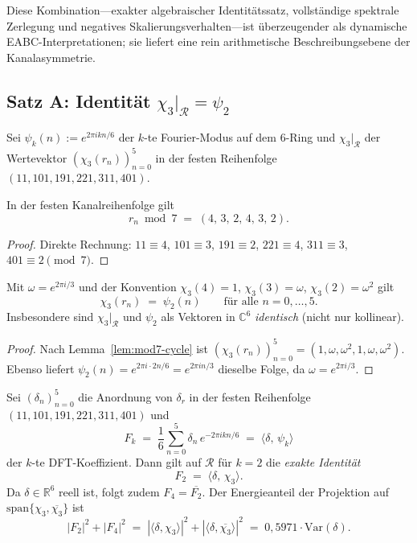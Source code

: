 Diese Kombination---exakter algebraischer Identitätssatz, vollständige
spektrale Zerlegung und negatives Skalierungsverhalten---ist
überzeugender als dynamische EABC-Interpretationen; sie liefert eine
rein arithmetische Beschreibungsebene der Kanalasymmetrie.

\subsection{Satz A: Identität $\chi_3|_{\mathcal{R}}=\psi_2$}

Sei $\psi_k(n) := e^{2\pi i kn/6}$ der $k$-te Fourier-Modus auf dem
$6$-Ring und $\chi_3|_{\mathcal{R}}$ der Wertevektor
$(\chi_3(r_n))_{n=0}^{5}$ in der festen Reihenfolge
$(11,101,191,221,311,401)$.

\begin{lemma}
\label{lem:mod7-cycle}
In der festen Kanalreihenfolge gilt
\[
  r_n \bmod 7 \;=\; (4,\,3,\,2,\,4,\,3,\,2).
\]
\end{lemma}

\begin{proof}
Direkte Rechnung:
$11\equiv 4$, $101\equiv 3$, $191\equiv 2$,
$221\equiv 4$, $311\equiv 3$, $401\equiv 2 \pmod{7}$.
\end{proof}

\begin{lemma}[Punktweise Übereinstimmung $\chi_3 = \psi_2$]
\label{lem:chi3-equals-psi2}
Mit $\omega = e^{2\pi i/3}$ und der Konvention
$\chi_3(4)=1$, $\chi_3(3)=\omega$, $\chi_3(2)=\omega^2$ gilt
\[
  \chi_3(r_n) \;=\; \psi_2(n)
  \qquad\text{für alle } n=0,\ldots,5.
\]
Insbesondere sind $\chi_3|_{\mathcal{R}}$ und $\psi_2$ als Vektoren in
$\mathbb{C}^6$ \emph{identisch} (nicht nur kollinear).
\end{lemma}

\begin{proof}
Nach Lemma~\ref{lem:mod7-cycle} ist
$(\chi_3(r_n))_{n=0}^{5} = (1,\omega,\omega^2,1,\omega,\omega^2)$.
Ebenso liefert $\psi_2(n)=e^{2\pi i\cdot 2n/6}=e^{2\pi i n/3}$ dieselbe
Folge, da $\omega = e^{2\pi i/3}$.
\end{proof}

\begin{theorem}[Satz A: $F_2=\langle\delta,\chi_3\rangle$]
\label{thm:dft-chi3}
Sei $(\delta_n)_{n=0}^{5}$ die Anordnung von $\delta_r$ in der festen
Reihenfolge $(11,101,191,221,311,401)$ und
\[
  F_k \;=\; \frac{1}{6}\sum_{n=0}^{5} \delta_n\, e^{-2\pi i kn/6}
  \;=\; \langle\delta,\,\psi_k\rangle
\]
der $k$-te DFT-Koeffizient.
Dann gilt auf $\mathcal{R}$ für $k=2$ die \emph{exakte Identität}
\[
  \boxed{F_2 \;=\; \langle\delta,\,\chi_3\rangle.}
\]
Da $\delta\in\mathbb{R}^6$ reell ist, folgt zudem $F_4=\overline{F_2}$.
Der Energieanteil der Projektion auf
$\mathrm{span}\{\chi_3,\overline{\chi_3}\}$ ist
\[
  |F_2|^2 + |F_4|^2
  \;=\;
  |\langle\delta,\chi_3\rangle|^2 + |\langle\delta,\overline{\chi_3}\rangle|^2
  \;=\; 0{,}5971 \cdot \mathrm{Var}(\delta).
\]
\end{theorem}

